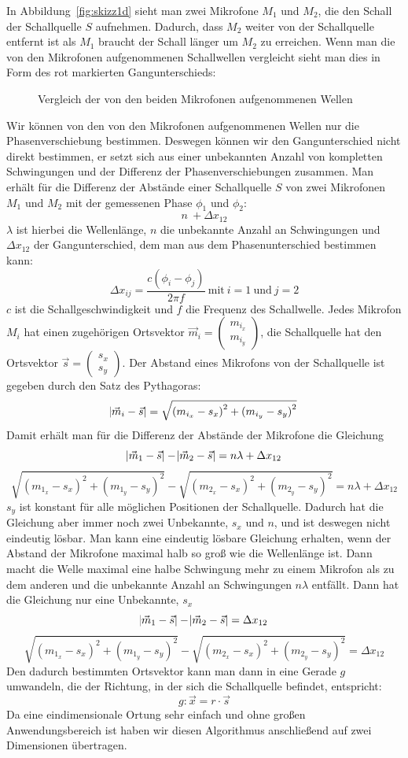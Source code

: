 In Abbildung~\ref{fig:skizz1d} sieht man zwei Mikrofone $M_1$ und $M_2$, die den Schall der Schallquelle $S$ aufnehmen. Dadurch, dass $M_2$ weiter von der Schallquelle entfernt ist als $M_1$ braucht der Schall länger um $M_2$ zu erreichen. Wenn man die von den Mikrofonen aufgenommenen Schallwellen vergleicht sieht man dies in Form des rot markierten Gangunterschieds:
\begin{figure}[H]

\caption{Vergleich der von den beiden Mikrofonen aufgenommenen Wellen}
\label{fig:welle1d}
\end{figure}
Wir können von den von den Mikrofonen aufgenommenen Wellen nur die Phasenverschiebung bestimmen. Deswegen können wir den Gangunterschied nicht direkt bestimmen, er setzt sich aus einer unbekannten Anzahl von kompletten Schwingungen und der Differenz der Phasenverschiebungen zusammen. Man erhält für die Differenz der Abstände einer Schallquelle $S$ von zwei Mikrofonen $M_1$ und $M_2$ mit der gemessenen Phase $\phi_1$ und $\phi_2$: $$n\ + \Delta{x_{12}}$$ $\lambda$ ist hierbei die Wellenlänge, $n$ die unbekannte Anzahl an Schwingungen und $\Delta{x_{12}}$ der Gangunterschied, dem man aus dem Phasenunterschied bestimmen kann:
$$\Delta{x_{ij}} = \frac{c(\phi_i - \phi_j)}{{2\pi}f}\:\textrm{mit}\:i = 1\:\textrm{und}\:j = 2$$
$c$ ist die Schallgeschwindigkeit und $f$ die Frequenz des Schallwelle.
Jedes Mikrofon $M_i$ hat einen zugehörigen Ortsvektor $\vec{m}_i = \begin{pmatrix} m_{i_x} \\ m_{i_y}  \end{pmatrix}$, die Schallquelle hat den Ortsvektor $\vec{s} = \begin{pmatrix} {s_x} \\ {s_y}  \end{pmatrix}$. Der Abstand eines Mikrofons von der Schallquelle ist gegeben durch den Satz des Pythagoras:
$$\abs{\vec{m}_i - \vec{s}} = \sqrt{{(m_{i_x} - s_x)}^2 + {(m_{i_y} - s_y)}^2}$$
Damit erhält man für die Differenz der Abstände der Mikrofone die Gleichung
$$\abs{\vec{m}_1 - \vec{s}} - \abs{\vec{m}_2 - \vec{s}} = n\lambda + \Delta{x_{12}}$$
$$\sqrt{{(m_{1_x} - s_x)}^2 + {(m_{1_y} - s_y)}^2} - \sqrt{{(m_{2_x} - s_x)}^2 + {(m_{2_y} - s_y)}^2} = n\lambda + \Delta{x_{12}}$$$s_y$ ist konstant für alle möglichen Positionen der Schallquelle. Dadurch hat die Gleichung aber immer noch zwei Unbekannte, $s_x$ und $n$, und ist deswegen nicht eindeutig lösbar. Man kann eine eindeutig lösbare Gleichung erhalten, wenn der Abstand der Mikrofone maximal halb so groß wie die Wellenlänge ist. Dann macht die Welle maximal eine halbe Schwingung mehr zu einem Mikrofon als zu dem anderen und die unbekannte Anzahl an Schwingungen $n\lambda$ entfällt. Dann hat die Gleichung nur eine Unbekannte, $s_x$
$$\abs{\vec{m}_1 - \vec{s}} - \abs{\vec{m}_2 - \vec{s}} = \Delta{x_{12}}$$
$$\sqrt{{(m_{1_x} - s_x)}^2 + {(m_{1_y} - s_y)}^2} - \sqrt{{(m_{2_x} - s_x)}^2 + {(m_{2_y} - s_y)}^2} = \Delta{x_{12}}$$
Den dadurch bestimmten Ortsvektor kann man dann in eine Gerade $g$ umwandeln, die der Richtung, in der sich die Schallquelle befindet, entspricht:
$$g: \vec{x} = r \cdot \vec{s}$$
Da eine eindimensionale Ortung sehr einfach und ohne großen Anwendungsbereich ist haben wir diesen Algorithmus anschließend auf zwei Dimensionen übertragen.

